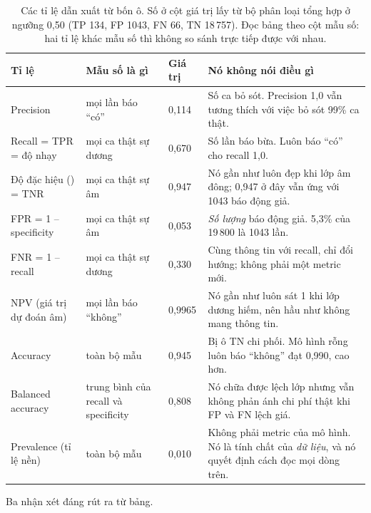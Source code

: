 \documentclass[../../deep_learning.tex]{subfiles}
\begin{document}
\begin{table}[H]\centering\footnotesize
\caption{Các tỉ lệ dẫn xuất từ bốn ô. Số ở cột giá trị lấy từ bộ phân loại tổng hợp ở ngưỡng 0{,}50 (TP 134, FP 1043, FN 66, TN 18\,757). Đọc bảng theo cột mẫu số: hai tỉ lệ khác mẫu số thì không so sánh trực tiếp được với nhau.}
\label{tab:b07-mauso}
\begin{tabularx}{\linewidth}{@{}L{2.35cm}L{2.75cm}L{1.3cm}Y@{}}
\toprule
\textbf{Tỉ lệ} & \textbf{Mẫu số là gì} & \textbf{Giá trị} & \textbf{Nó không nói điều gì}\\
\midrule
Precision & mọi lần báo ``có'' & 0{,}114 & Số ca bỏ sót. Precision 1{,}0 vẫn tương thích với việc bỏ sót 99\% ca thật.\\
Recall = TPR = độ nhạy & mọi ca thật sự dương & 0{,}670 & Số lần báo bừa. Luôn báo ``có'' cho recall 1{,}0.\\
Độ đặc hiệu () = TNR & mọi ca thật sự âm & 0{,}947 & Nó gần như luôn đẹp khi lớp âm đông; 0{,}947 ở đây vẫn ứng với 1043 báo động giả.\\
FPR = 1 -- specificity & mọi ca thật sự âm & 0{,}053 & \emph{Số lượng} báo động giả. 5{,}3\% của 19\,800 là 1043 lần.\\
FNR = 1 -- recall & mọi ca thật sự dương & 0{,}330 & Cùng thông tin với recall, chỉ đổi hướng; không phải một metric mới.\\
NPV (giá trị dự đoán âm) & mọi lần báo ``không'' & 0{,}9965 & Nó gần như luôn sát 1 khi lớp dương hiếm, nên hầu như không mang thông tin.\\
Accuracy & toàn bộ mẫu & 0{,}945 & Bị ô TN chi phối. Mô hình rỗng luôn báo ``không'' đạt 0{,}990, cao hơn.\\
Balanced accuracy & trung bình của recall và specificity & 0{,}808 & Nó chữa được lệch lớp nhưng vẫn không phản ánh chi phí thật khi FP và FN lệch giá.\\
Prevalence (tỉ lệ nền) & toàn bộ mẫu & 0{,}010 & Không phải metric của mô hình. Nó là tính chất của \emph{dữ liệu}, và nó quyết định cách đọc mọi dòng trên.\\
\bottomrule
\end{tabularx}
\end{table}

Ba nhận xét đáng rút ra từ bảng.
\end{document}

